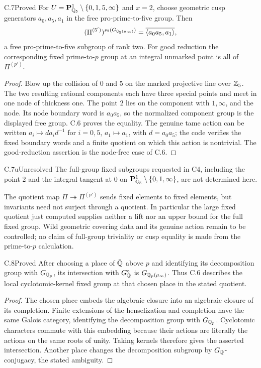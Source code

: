 \begin{claim}{C.7}{Proved}
For $U=\mathbf P^1_{\mathbb Q_5}\setminus\{0,1,5,\infty\}$ and $x=2$, choose
geometric cusp generators $a_0,a_5,a_1$ in the free pro-prime-to-five group.
Then
\[
 (\Pi^{(5')})^{s_2(G_{\mathbb Q_5(\mu_\infty)})}
 =\overline{\langle a_0a_5,a_1\rangle},
\]
a free pro-prime-to-five subgroup of rank two. For good reduction the
corresponding fixed prime-to-$p$ group at an integral unmarked point is
all of $\Pi^{(p')}$.
\end{claim}
\begin{proof}
Blow up the collision of $0$ and $5$ on the marked projective line over
$\mathbb Z_5$. The two resulting rational components each have three special
points and meet in one node of thickness one. The point $2$ lies on the
component with $1,\infty$, and the node. Its node boundary word is
$a_0a_5$, so the normalized component group is the displayed free group.
C.6 proves the equality. The genuine tame action can be written
$a_i\mapsto d a_i d^{-1}$ for $i=0,5$, $a_1\mapsto a_1$, with
$d=a_0a_5$; the code verifies the fixed boundary words and a finite quotient
on which this action is nontrivial. The good-reduction assertion is the
node-free case of C.6.
\end{proof}

\begin{claim}{C.7u}{Unresolved}
The full-group fixed subgroups requested in C4, including the point $2$
and the integral tangent at $0$ on
$\mathbf P^1_{\mathbb Q_5}\setminus\{0,1,\infty\}$, are not determined here.
\end{claim}
The quotient map
$\Pi\twoheadrightarrow\Pi^{(p')}$ sends fixed elements to fixed elements,
but invariants need not surject through a quotient. In particular the large
fixed quotient just computed supplies neither a lift nor an upper bound
for the full fixed group. Wild geometric covering data and its genuine
action remain to be controlled; no claim of full-group triviality or cusp
equality is made from the prime-to-$p$ calculation.

\begin{claim}{C.8}{Proved}
After choosing a place of $\bar{\mathbb Q}$ above $p$ and identifying its decomposition
group with $G_{\mathbb Q_p}$, its intersection with $G_\mathbb Q^\circ$ is
$G_{\mathbb Q_p(\mu_\infty)}$. Thus C.6 describes the local cyclotomic-kernel fixed
group at that chosen place in the stated quotient.
\end{claim}
\begin{proof}
The chosen place embeds the algebraic closure into an algebraic closure of
its completion. Finite extensions of the henselization and completion
have the same Galois category, identifying the decomposition group with
$G_{\mathbb Q_p}$. Cyclotomic characters commute with this embedding because
their actions are literally the actions on the same roots of unity.
Taking kernels therefore gives the asserted intersection. Another place
changes the decomposition subgroup by $G_\mathbb Q$-conjugacy, the stated ambiguity.
\end{proof}

